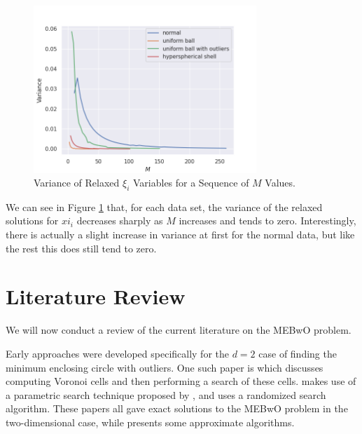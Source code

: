 \documentclass[11pt,twoside]{report}
\theoremstyle{definition}
\numberwithin{theorem}{section}
\numberwithin{definition}{section}
\numberwithin{lemma}{section}
\numberwithin{proposition}{section}
\numberwithin{equation}{section}
\numberwithin{figure}{section}
\begin{document}
\begin{figure}
    \centering
    \includegraphics[width=0.75\textwidth]{xi_analysis.png}
    \caption{Variance of Relaxed $\xi_i$ Variables for a Sequence of $M$ Values.}
    \label{fig:xi analysis}
\end{figure}

We can see in Figure \ref{fig:xi analysis} that, for each data set, the variance of the relaxed solutions for $xi_i$ decreases sharply as $M$ increases and tends to zero. Interestingly, there is actually a slight increase in variance at first for the normal data, but like the rest this does still tend to zero.

\section{Literature Review}\label{lit review}
We will now conduct a review of the current literature on the MEBwO problem.

Early approaches were developed specifically for the $d=2$ case of finding the minimum enclosing circle with outliers. One such paper is \cite{AGGARWAL199138} which discusses computing Voronoi cells \cite{Voronoi1908} and then performing a search of these cells. \cite{efrat} makes use of a parametric search technique proposed by \cite{megiddo}, and \cite{MATOUSEK1995217} uses a randomized search algorithm. These papers all gave exact solutions to the MEBwO problem in the two-dimensional case, while \cite{harpeled} presents some approximate algorithms.
\end{document}
